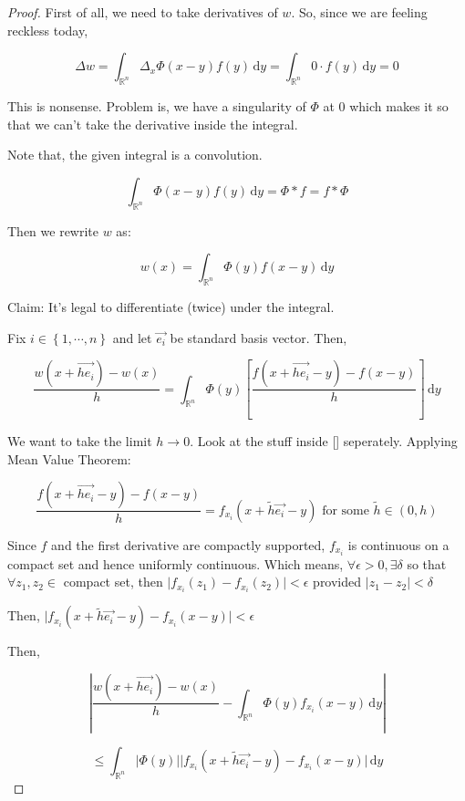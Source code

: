 \documentclass{article}
\theoremstyle{definition}
\begin{document}
\begin{proof}
    First of all, we need to take derivatives of \(w\). So, since we are feeling reckless today,

    \[
        \Delta w = \int_{\mathbb{R} ^n}^{} \Delta _x \Phi(x-y) f(y) \,\mathrm{d}y = \int_{\mathbb{R} ^n}^{} 0\cdot f(y) \,\mathrm{d}y = 0 
    \]

    This is nonsense. Problem is, we have a singularity of \(\Phi\) at \(0\) which makes it so that we can't take the derivative inside the integral.

    Note that, the given integral is a convolution.

    \[
        \int_{\mathbb{R}^n}^{} \Phi(x-y)f(y) \,\mathrm{d}y = \Phi * f = f * \Phi 
    \]

    Then we rewrite \(w\) as:

    \[
        w(x) = \int_{\mathbb{R} ^n}^{} \Phi(y) f(x-y) \,\mathrm{d}y 
    \]

    Claim: It's legal to differentiate (twice) under the integral.

    Fix \(i\in \left\{ 1,\cdots, n \right\} \) and let \(\vec{e_i}\) be standard basis vector. Then,
    
    \[
        \frac{w(x+\vec{he_i})-w(x)}{h} = \int_{\mathbb{R}^n}^{} \Phi(y) \left[ \frac{f(x+\vec{he_i} -y)-f(x-y)}{h} \right]  \,\mathrm{d}y 
    \]

    We want to take the limit \(h\to 0\). Look at the stuff inside [] seperately. Applying Mean Value Theorem:
    
    \[
        \frac{f(x+\vec{he_i} -y)-f(x-y)}{h} = f_{x_i}(x+\tilde{h}\vec{e_i} -y) \text{ for some \(\tilde{h}\in (0,h)\)} 
    \]

    Since \(f\) and the first derivative are compactly supported, \(f_{x_i}\) is continuous on a compact set and hence uniformly continuous. Which means, \(\forall \epsilon >0, \exists \delta \) so that \(\forall z_1,z_2 \in \) compact set, then \(\vert f_{x_i}(z_1) - f_{x_i} (z_2)      \vert < \epsilon \) provided \(\vert z_1 - z_2 \vert < \delta \) 

    Then, \(\vert f_{x_i}(x+\tilde{h}\vec{e_i} -y) - f_{x_i}(x-y) \vert < \epsilon \) 

    Then,

    \[
        \left\vert \frac{w(x+\vec{he_i} )-w(x)}{h} - \int_{\mathbb{R} ^n}^{} \Phi(y)f_{x_i}(x-y) \,\mathrm{d}y \right\vert
    \]

    \[
        \leq\int_{\mathbb{R}^n}^{} \vert \Phi(y) \vert \vert f_{x_i}(x+\tilde{h}\vec{e_i} -y)-f_{x_i}(x-y) \vert  \,\mathrm{d}y 
    \]


\end{proof}
\end{document}
